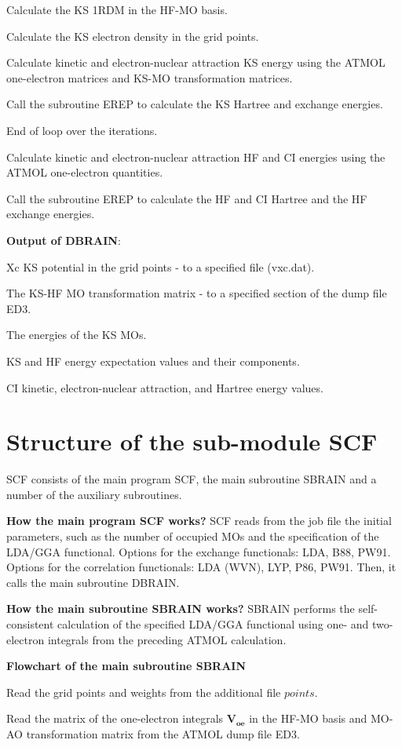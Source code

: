\documentclass[onecolumn,preprintnumbers,amsmath,amssymb]{revtex4}
\begin{document}
Calculate the KS 1RDM in the HF-MO basis.

Calculate the KS electron density in the grid points.

Calculate kinetic and electron-nuclear attraction KS energy using the ATMOL one-electron matrices and KS-MO transformation matrices.

Call the subroutine EREP to calculate the KS Hartree and exchange energies. 

End of loop over the iterations.

Calculate kinetic and electron-nuclear attraction HF and CI energies using the ATMOL one-electron quantities.

Call the subroutine EREP to calculate the HF and CI Hartree and the HF exchange energies.

\textbf{Output of DBRAIN}:

Xc KS potential in the grid points - to a specified file (vxc.dat).

The KS-HF MO transformation matrix - to a specified section of the dump file ED3.

The energies of the KS MOs.

KS and HF energy expectation values and their components.

CI kinetic, electron-nuclear attraction, and Hartree energy values.

\section{Structure of the sub-module SCF}
SCF consists of the main program SCF, the main subroutine SBRAIN and a number of the auxiliary subroutines.

\textbf{How the main program SCF works?} SCF reads from the job file the initial parameters, such as the number of occupied MOs and the specification of the LDA/GGA functional. Options for the exchange functionals: LDA, B88, PW91. Options for the correlation functionals: LDA (WVN), LYP, P86, PW91. Then, it calls the main subroutine DBRAIN. 

\textbf{How the main subroutine SBRAIN works?} SBRAIN performs the self-consistent calculation of the specified LDA/GGA functional using one- and two-electron integrals from the preceding ATMOL calculation.

\textbf{Flowchart of the main subroutine SBRAIN}

Read the grid points and weights from the additional file $points$. 

Read the matrix of the one-electron integrals $\mathbf{V_{oe}}$ in the HF-MO basis and MO-AO transformation matrix from the ATMOL dump file ED3. 
\end{document}
